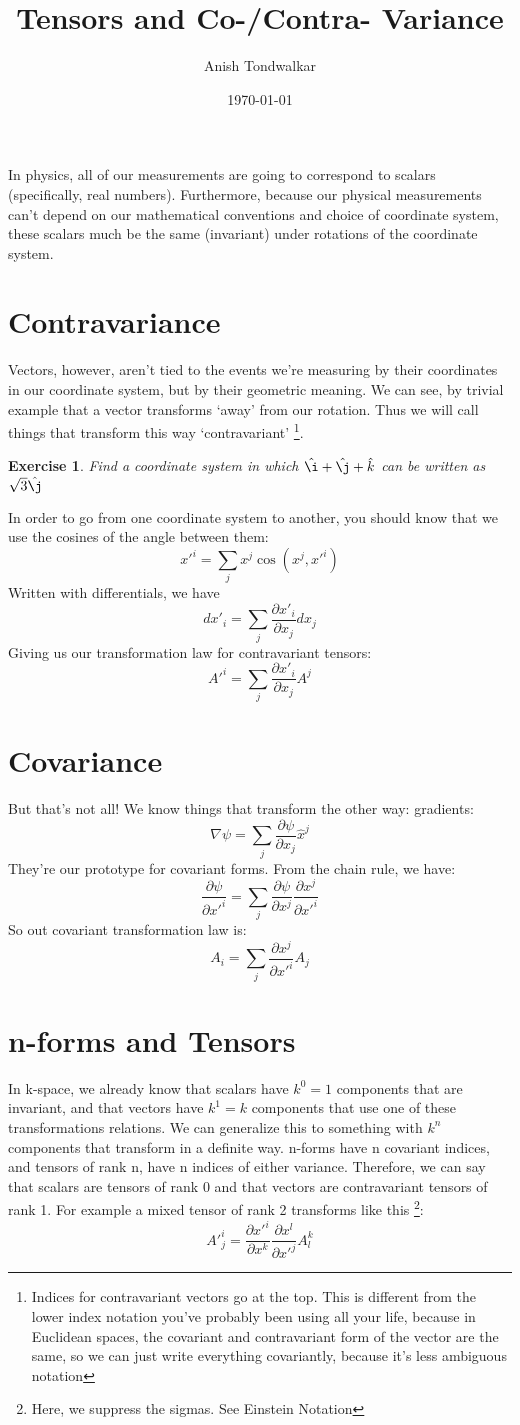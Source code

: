\documentclass[11pt,notitlepage]{article}
\title{Tensors and Co-/Contra- Variance}
\author{Anish Tondwalkar}
\date{\today}
\newtheorem{exc}{Exercise}[section]
\begin{document}
\maketitle
In physics, all of our measurements are going to correspond to scalars (specifically, real numbers). 
Furthermore, because our physical measurements can't depend on our mathematical conventions and choice of coordinate system,
these scalars much be the same (invariant) under rotations of the coordinate system.
\section{Contravariance}
Vectors, however, aren't tied to the events we're measuring by their coordinates in our coordinate system, but by their geometric meaning.
We can see, by trivial example that a vector transforms `away' from our rotation. 
Thus we will call things that transform this way `contravariant'
\footnote{Indices for contravariant vectors go at the top. This is different from the lower index notation you've probably been using all your life, because in Euclidean spaces, the covariant and contravariant form of the vector are the same, so we can just write everything covariantly, because it's less ambiguous notation}. 
\begin{exc}
Find a coordinate system in which
$\hat\i + \hat\j + \hat k$
 can be written as $\sqrt3 \hat\j$
\end{exc}
In order to go from one coordinate system to another, you should know that we use the cosines of the angle between them:
$$ x'^i = \sum_j x^j \cos(x^j,x'^i) $$
Written with differentials, we have
$$ dx'_i = \sum_j \frac{\partial x'_i}{\partial x_j} dx_j $$
Giving us our transformation law for contravariant tensors:
$$ A'^i = \sum_j \frac{\partial x'_i}{\partial x_j} A^j $$
\section{Covariance}
But that's not all! We know things that transform the other way: gradients:
$$ \nabla \psi = \sum_j \frac{\partial \psi}{\partial x_j} \hat x^j $$
 They're our prototype for covariant forms. 
From the chain rule, we have: 
$$\frac{\partial \psi}{\partial x'^i} = \sum_j \frac{\partial \psi}{\partial x^j} \frac{\partial x^j}{\partial x'^i} $$
So out covariant transformation law is:
$$ A_i = \sum_j \frac{\partial x^j}{\partial x'^i} A_j$$

\section{n-forms and Tensors}
In k-space, we already know that scalars have $k^0=1$ components that are invariant, and that vectors have $k^1=k$ components that use one of these transformations relations. We can generalize this to something with $k^n$ components that transform in a definite way. n-forms have n covariant indices, and tensors of rank n, have n indices of either variance. Therefore, we can say that scalars are tensors of rank 0 and that vectors are contravariant tensors of rank 1. For example a mixed tensor of rank 2 transforms like this \footnote{Here, we suppress the sigmas. See Einstein Notation}:
$$A'^i_j =  \frac{\partial x'^i}{\partial x^k}\frac{\partial x^l}{\partial x'^j} A^k_l $$
\end{document}
